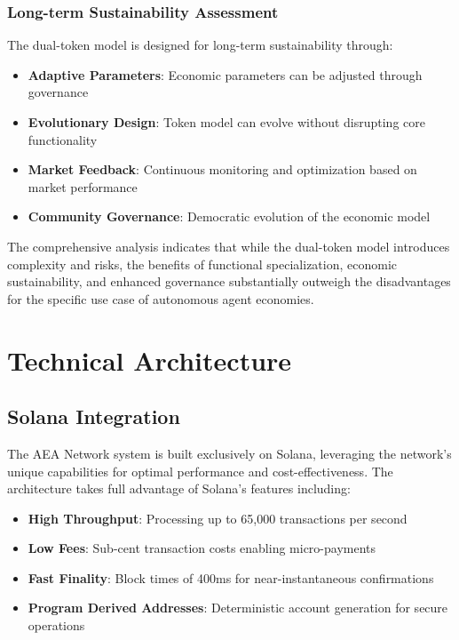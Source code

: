 \documentclass[12pt,a4paper]{article}
\begin{document}
\subsubsection{Long-term Sustainability Assessment}

The dual-token model is designed for long-term sustainability through:

\begin{itemize}
\item \textbf{Adaptive Parameters}: Economic parameters can be adjusted through governance
\item \textbf{Evolutionary Design}: Token model can evolve without disrupting core functionality
\item \textbf{Market Feedback}: Continuous monitoring and optimization based on market performance
\item \textbf{Community Governance}: Democratic evolution of the economic model
\end{itemize}

The comprehensive analysis indicates that while the dual-token model introduces complexity and risks, the benefits of functional specialization, economic sustainability, and enhanced governance substantially outweigh the disadvantages for the specific use case of autonomous agent economies.

\section{Technical Architecture}

\subsection{Solana Integration}

The AEA Network system is built exclusively on Solana, leveraging the network's unique capabilities for optimal performance and cost-effectiveness. The architecture takes full advantage of Solana's features including:

\begin{itemize}
\item \textbf{High Throughput}: Processing up to 65,000 transactions per second
\item \textbf{Low Fees}: Sub-cent transaction costs enabling micro-payments
\item \textbf{Fast Finality}: Block times of 400ms for near-instantaneous confirmations
\item \textbf{Program Derived Addresses}: Deterministic account generation for secure operations
\end{itemize}
\end{document}
